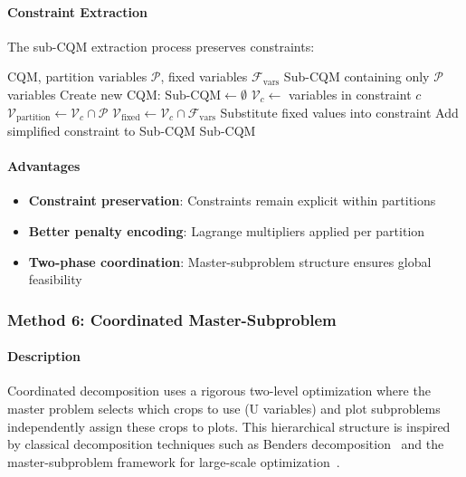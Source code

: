 \documentclass{oqireport}
\begin{document}
\paragraph{Constraint Extraction}

The sub-CQM extraction process preserves constraints:

\begin{algorithm}
\caption{Extract Sub-CQM}
\begin{algorithmic}[1]
\Require CQM, partition variables $\mathcal{P}$, fixed variables $\mathcal{F}_{\text{vars}}$
\Ensure Sub-CQM containing only $\mathcal{P}$ variables
\State Create new CQM: $\text{Sub-CQM} \leftarrow \emptyset$
    \State $\mathcal{V}_c \leftarrow$ variables in constraint $c$
    \State $\mathcal{V}_{\text{partition}} \leftarrow \mathcal{V}_c \cap \mathcal{P}$
    \State $\mathcal{V}_{\text{fixed}} \leftarrow \mathcal{V}_c \cap \mathcal{F}_{\text{vars}}$
        \State Substitute fixed values into constraint
        \State Add simplified constraint to Sub-CQM
    \EndIf
\EndFor
\State \Return Sub-CQM
\end{algorithmic}
\end{algorithm}

\paragraph{Advantages}
\begin{itemize}
\item \textbf{Constraint preservation}: Constraints remain explicit within partitions
\item \textbf{Better penalty encoding}: Lagrange multipliers applied per partition
\item \textbf{Two-phase coordination}: Master-subproblem structure ensures global feasibility
\end{itemize}

\subsubsection{Method 6: Coordinated Master-Subproblem}

\paragraph{Description}
Coordinated decomposition uses a rigorous two-level optimization where the master problem selects which crops to use (U variables) and plot subproblems independently assign these crops to plots. This hierarchical structure is inspired by classical decomposition techniques such as Benders decomposition~\cite{geoffrion1972generalized} and the master-subproblem framework for large-scale optimization~\cite{lasdon1970optimization}.
\end{document}
